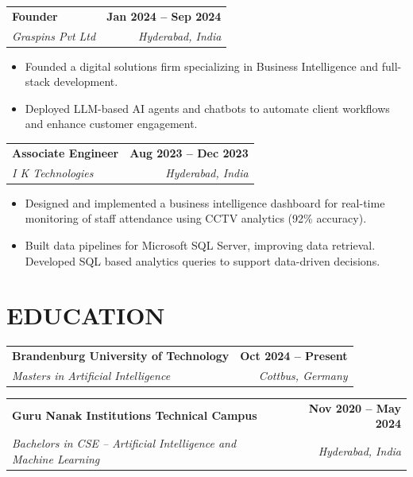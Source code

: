 \documentclass[a4paper,11pt]{article}
\makeatletter
\newcommand{\entryheader}[4]{%
  \begin{tabularx}{\textwidth}{@{}>{\RaggedRight\arraybackslash}X r@{}}
    \textbf{#1} & \textbf{#2} \\
    \textit{#3} & \textit{#4} \\
  \end{tabularx}%
}
\newenvironment{entrybullets}{%
  \begin{minipage}[t]{0.77\textwidth}
    \begin{itemize}[leftmargin=*,label=\textbullet,align=left]
}{%
    \end{itemize}
  \end{minipage}
}
\makeatother
\begin{document}
\vspace{0.25cm}
\entryheader{Founder}{Jan 2024 -- Sep 2024}{Graspins Pvt Ltd}{Hyderabad, India}
\begin{entrybullets}
  \item Founded a digital solutions firm specializing in Business Intelligence and full-stack development.
  \item Deployed LLM-based AI agents and chatbots to automate client workflows and enhance customer engagement.
\end{entrybullets}

\vspace{0.25cm}
\entryheader{Associate Engineer}{Aug 2023 -- Dec 2023}{I K Technologies}{Hyderabad, India}
\begin{entrybullets}
  \item Designed and implemented a business intelligence dashboard for real-time monitoring of staff attendance using CCTV analytics (92\% accuracy).
  \item Built data pipelines for Microsoft SQL Server, improving data retrieval. Developed SQL based analytics queries to support data-driven decisions.
\end{entrybullets}

\section*{EDUCATION}
\begin{tabularx}{\textwidth}{@{}X r@{}}
  \textbf{Brandenburg University of Technology} & \textbf{Oct 2024 -- Present} \\
  \textit{Masters in Artificial Intelligence} & \textit{Cottbus, Germany} \\
\end{tabularx}

\vspace{0.25cm}
\begin{tabularx}{\textwidth}{@{}X r@{}}
  \textbf{Guru Nanak Institutions Technical Campus} & \textbf{Nov 2020 -- May 2024} \\
  \textit{Bachelors in CSE -- Artificial Intelligence and Machine Learning} & \textit{Hyderabad, India} \\
\end{tabularx}

\end{document}
